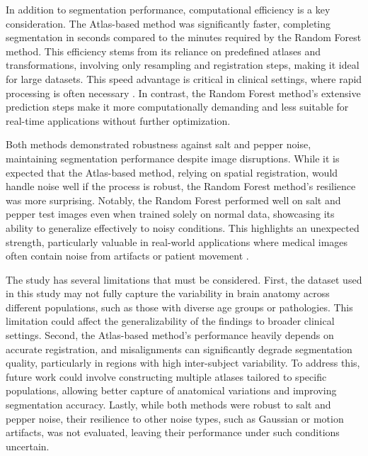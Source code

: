 In addition to segmentation performance, computational efficiency is a key consideration. The Atlas-based method was significantly faster, completing segmentation in seconds compared to the minutes required by the Random Forest method. This efficiency stems from its reliance on predefined atlases and transformations, involving only resampling and registration steps, making it ideal for large datasets. This speed advantage is critical in clinical settings, where rapid processing is often necessary \cite{b19}. In contrast, the Random Forest method’s extensive prediction steps make it more computationally demanding and less suitable for real-time applications without further optimization.

Both methods demonstrated robustness against salt and pepper noise, maintaining segmentation performance despite image disruptions. While it is expected that the Atlas-based method, relying on spatial registration, would handle noise well if the process is robust, the Random Forest method's resilience was more surprising. Notably, the Random Forest performed well on salt and pepper test images even when trained solely on normal data, showcasing its ability to generalize effectively to noisy conditions. This highlights an unexpected strength, particularly valuable in real-world applications where medical images often contain noise from artifacts or patient movement \cite{b20}.

The study has several limitations that must be considered. First, the dataset used in this study may not fully capture the variability in brain anatomy across different populations, such as those with diverse age groups or pathologies. This limitation could affect the generalizability of the findings to broader clinical settings. Second, the Atlas-based method’s performance heavily depends on accurate registration, and misalignments can significantly degrade segmentation quality, particularly in regions with high inter-subject variability. To address this, future work could involve constructing multiple atlases tailored to specific populations, allowing better capture of anatomical variations and improving segmentation accuracy. Lastly, while both methods were robust to salt and pepper noise, their resilience to other noise types, such as Gaussian or motion artifacts, was not evaluated, leaving their performance under such conditions uncertain.